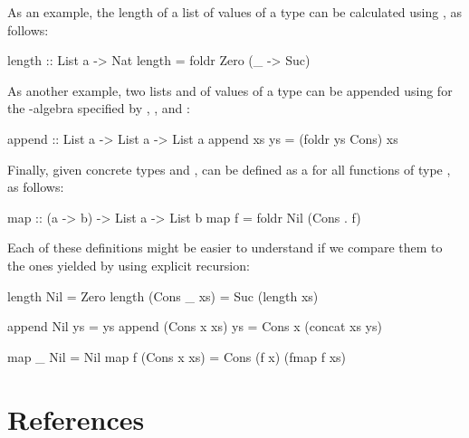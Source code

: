 \begin{example}
  As an example, the length of a list of values of a type
   can be calculated using , as
  follows:
  \begin{codehaskell}
length :: List a -> Nat
length = foldr Zero (\_ -> Suc)
  \end{codehaskell}
  As another example, two lists  and 
  of values of a type  can be appended using
   for the -algebra specified by
  , , and :
  \begin{codehaskell}
append :: List a -> List a -> List a
append xs ys = (foldr ys Cons) xs
  \end{codehaskell}
  Finally, given concrete types  and ,
   can be defined as a  for all
  functions  of type , as follows:
  \begin{codehaskell}
map :: (a -> b) -> List a -> List b
map f = foldr Nil (Cons . f)
  \end{codehaskell}
  Each of these definitions might be easier to understand if we
  compare them to the ones yielded by using explicit recursion:
  \begin{codehaskell}
length Nil         = Zero
length (Cons _ xs) = Suc (length xs)

append Nil         ys = ys
append (Cons x xs) ys = Cons x (concat xs ys)

map _ Nil         = Nil
map f (Cons x xs) = Cons (f x) (fmap f xs)
  \end{codehaskell}

\end{example}

\section{References}
\label{sec:algebras-references}


\clearemptydoublepage
